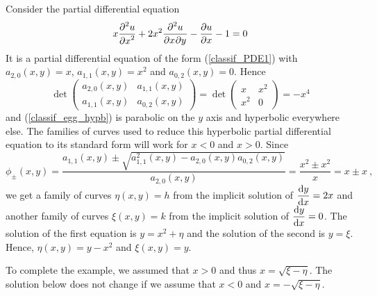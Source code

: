 \begin{egg}
Consider the partial differential equation          \label{classif_egg_hyperb1}
\begin{equation} \label{classif_egg_hypb}
x \pdydxn{u}{x}{2} + 2 x^2 \pdydxnm{u}{x}{y}{2}{}{} - \pdydx{u}{x} - 1
= 0
\end{equation}
It is a partial differential equation of the form (\ref{classif_PDE1}) with
$a_{2,0}(x,y) = x$, $\displaystyle a_{1,1}(x,y) = x^2$ and $a_{0,2}(x,y) = 0$.
Hence
\[
\det \begin{pmatrix}
a_{2,0}(x,y) & a_{1,1}(x,y) \\
a_{1,1}(x,y) & a_{0,2}(x,y)  
\end{pmatrix}
=
\det \begin{pmatrix}
x & x^2 \\
x^2 & 0  
\end{pmatrix}
=-x^4
\]
and (\ref{classif_egg_hypb}) is parabolic on the $y$ axis and
hyperbolic everywhere else.  The families of curves used to reduce this
hyperbolic partial differential equation to its standard form will
work for $x<0$ and $x>0$.  Since
\[
\phi_{\pm}(x,y) = \frac{a_{1,1}(x,y) \pm
\sqrt{a_{1,1}^2(x,y)-a_{2,0}(x,y)a_{0,2}(x,y)}}{a_{2,0}(x,y)}
= \frac{x^2 \pm x^2}{x} = x \pm x \ ,
\]
we get a family of curves $\eta(x,y) = h$ from the implicit
solution of $\displaystyle \dydx{y}{x} = 2x$ and another family of curves
$\xi(x,y) = k$ from the implicit solution of
$\displaystyle \dydx{y}{x} = 0$.  The solution of the first equation
is $\displaystyle y = x^2 + \eta$ and the solution of the second is
$y=\xi$.  Hence, $\displaystyle \eta(x,y)=y-x^2$ and $\xi(x,y) = y$.

To complete the example, we assumed that $x>0$ and thus
$x=\sqrt{\xi-\eta}$.  The solution below does not change if we assume
that $x<0$ and $x= -\sqrt{\xi-\eta}$.


\end{egg}
